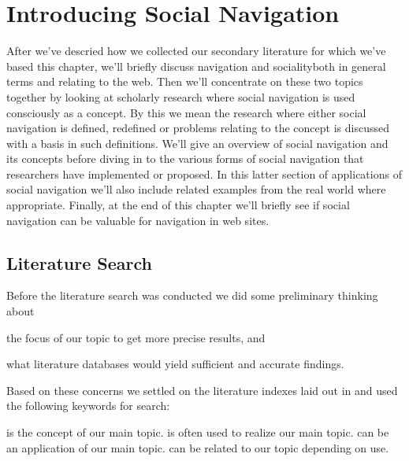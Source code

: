 \chapter{Introducing Social Navigation}
\label{chapter:social.navigation}

After we've descried how we collected our secondary literature for which we've
based this chapter, we'll briefly discuss navigation and sociality\dash{}both
in general terms and relating to the web. Then we'll concentrate on these two
topics together by looking at scholarly research where social navigation is
used consciously as a concept. By this we mean the research where either
social navigation is defined, redefined or problems relating to the concept is
discussed with a basis in such definitions.
We'll give an overview of social navigation and its concepts before diving in
to the various forms of social navigation that researchers have implemented
or proposed. In this latter section of applications of social navigation we'll
also include related examples from the real world where appropriate.
Finally, at the end of this chapter we'll briefly see if social navigation
can be valuable for navigation in web sites.

\enlargethispage{-\baselineskip}

\section{Literature Search}
\label{section:literature.search}

Before the literature search was conducted we did some preliminary thinking
about
\begin{inparaenum}[(i)]
  \item the focus of our topic to get more precise results, and
  \item what literature databases would yield sufficient and accurate
    findings.
\end{inparaenum}
Based on these concerns we settled on the literature indexes laid out in
 and used the following keywords%
for search:

\begin{items}
   is the concept of our main topic.
   is often used to realize our
    main topic.
   can be an application of our main topic.
   can be related to our topic depending on use.
\end{items}

